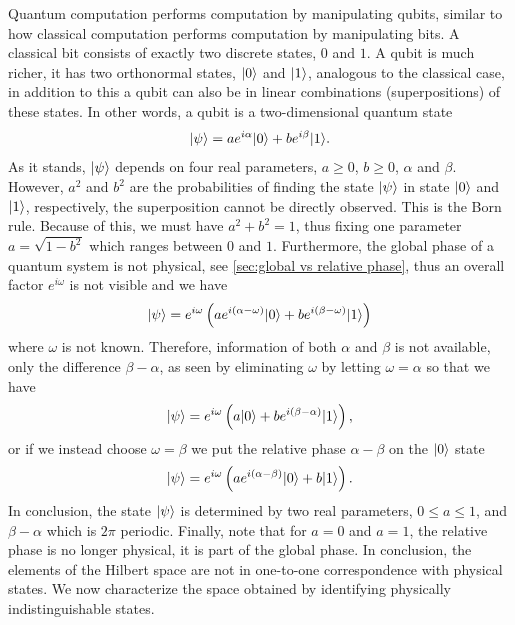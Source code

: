 Quantum computation performs computation by manipulating qubits, similar to how classical computation performs computation by manipulating bits. A classical bit consists of exactly two discrete states, $0$ and $1$. A qubit is much richer, it has two orthonormal states, $\lvert0\rangle$ and $\lvert1\rangle$, analogous to the classical case, in addition to this a qubit can also be in linear combinations (superpositions) of these states. In other words, a qubit is a two-dimensional quantum state
\begin{equation}
  \lvert\psi\rangle = a e^{i\alpha} \lvert0\rangle + b e^{i\beta} \lvert1\rangle.
\end{equation}
As it stands, $\lvert\psi\rangle$ depends on four real parameters, $a\ge 0$, $b\ge 0$, $\alpha$ and $\beta$. However, $a^2$ and $b^2$ are the probabilities of finding the state $\lvert\psi\rangle$ in state $\lvert0\rangle$ and $\lvert1\rangle$, respectively, the superposition cannot be directly observed. This is the Born rule. Because of this, we must have $a^2+b^2 = 1$, thus fixing one parameter $a = \sqrt{1-b^2}$ which ranges between $0$ and $1$. Furthermore, the global phase of a quantum system is not physical, see \cref{sec:global vs relative phase}, thus an overall factor $e^{i\omega}$ is not visible and we have
\begin{equation}
  \lvert\psi\rangle = e^{i\omega}\left( a e^{i(\alpha-\omega)} \lvert0\rangle + b e^{i(\beta-\omega)} \lvert1\rangle \right)
\end{equation}
where $\omega$ is not known. Therefore, information of both $\alpha$ and $\beta$ is not available, only the difference $\beta-\alpha$, as seen by eliminating $\omega$ by letting $\omega = \alpha$ so that we have
\begin{equation}
  \lvert\psi\rangle = e^{i\omega}\left( a\lvert0\rangle+be^{i(\beta-\alpha)}\lvert1\rangle \right),
\end{equation}
or if we instead choose $\omega = \beta$ we put the relative phase $\alpha-\beta$ on the $\lvert0\rangle$ state
\begin{equation}
  \lvert\psi\rangle = e^{i\omega}\left( ae^{i(\alpha-\beta)}\lvert0\rangle+b\lvert1\rangle \right).
\end{equation}
In conclusion, the state $\lvert\psi\rangle$ is determined by two real parameters, $0 \le a \le 1$, and $\beta - \alpha$ which is $2\pi$ periodic. Finally, note that for $a = 0$ and $a = 1$, the relative phase is no longer physical, it is part of the global phase. In conclusion, the elements of the Hilbert space are not in one-to-one correspondence with physical states. We now characterize the space obtained by identifying physically indistinguishable states.



